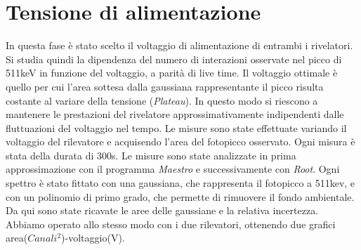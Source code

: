 \documentclass[italian,11pt]{report}
\begin{document}
\section{Tensione di alimentazione}
In questa fase è stato scelto il voltaggio di alimentazione di entrambi i rivelatori. Si studia quindi la dipendenza del numero di interazioni osservate nel picco di 511keV in funzione del voltaggio, a parità di live time. Il voltaggio ottimale è quello per cui l'area sottesa dalla gaussiana rappresentante il picco risulta costante al variare della tensione (\textit{Plateau}). In questo modo si riescono a mantenere le prestazioni del rivelatore approssimativamente indipendenti dalle fluttuazioni del voltaggio nel tempo.
Le misure sono state effettuate variando il voltaggio del rilevatore e acquisendo l'area del fotopicco osservato. Ogni misura è stata della durata di 300s. Le misure sono state analizzate in prima approssimazione con il programma \textit{Maestro} e successivamente con \textit{Root}. Ogni spettro è stato fittato con una gaussiana, che rappresenta il fotopicco a 511kev, e con un polinomio di primo grado, che permette di rimuovere il fondo ambientale. Da qui sono state ricavate le aree delle gaussiane e la relativa incertezza. Abbiamo operato allo stesso modo con i due rilevatori, ottenendo due grafici area($Canali^{2}$)-voltaggio(V).
\end{document}
